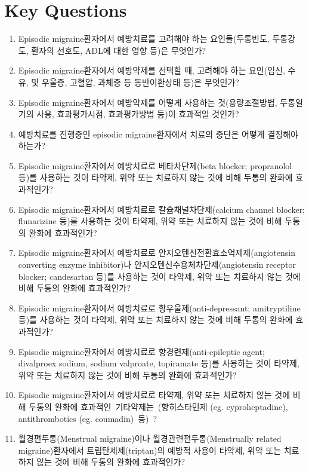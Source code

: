 \documentclass{paper}
\begin{document}
\section{Key Questions}
\begin{enumerate}
	\item Episodic migraine환자에서 예방치료를 고려해야 하는 요인들(두통빈도, 두통강도, 환자의 선호도, ADL에 대한 영향 등)은 무엇인가?
	\item Episodic migraine환자에서 예방약제를 선택할 때, 고려해야 하는 요인(임신, 수유, 및 우울증, 고혈압, 과체중 등 동반이환상태 등)은 무엇인가?
	\item Episodic migraine환자에서 예방약제를 어떻게 사용하는 것(용량조절방법, 두통일기의 사용, 효과평가시점, 효과평가방법 등)이 효과적일 것인가?
	\item 예방치료를 진행중인 episodic migraine환자에서 치료의 중단은 어떻게 결정해야 하는가?
	\item Episodic migraine환자에서 예방치료로 베타차단제(beta blocker; propranolol 등)를 사용하는 것이 타약제, 위약 또는 치료하지 않는 것에 비해 두통의 완화에 효과적인가?
	\item Episodic migraine환자에서 예방치료로 칼슘채널차단제(calcium channel blocker; flunarizine 등)를 사용하는 것이 타약제, 위약 또는 치료하지 않는 것에 비해 두통의 완화에 효과적인가?
	\item Episodic migraine환자에서 예방치료로 안지오텐신전환효소억제제(angiotensin converting enzyme inhibitor)나 안지오텐신수용체차단제(angiotensin receptor blocker; candesartan 등)를 사용하는 것이 타약제, 위약 또는 치료하지 않는 것에 비해 두통의 완화에 효과적인가?
	\item Episodic migraine환자에서 예방치료로 항우울제(anti-depressant; amitryptiline 등)를 사용하는 것이 타약제, 위약 또는 치료하지 않는 것에 비해 두통의 완화에 효과적인가?
	\item Episodic migraine환자에서 예방치료로 항경련제(anti-epileptic agent; divalproex sodium, sodium valproate, topiramate 등)를 사용하는 것이 타약제, 위약 또는 치료하지 않는 것에 비해 두통의 완화에 효과적인가?
	\item Episodic migraine환자에서 예방치료로 타약제, 위약 또는 치료하지 않는 것에 비해 두통의 완화에 효과적인 기타약제는 (항히스타민제 (eg. cyproheptadine), antithrombotics (eg. coumadin) 등) ?
	\item 월경편두통(Menstrual migraine)이나 월경관련편두통(Menstrually related migraine)환자에서 트립탄제제(triptan)의 예방적 사용이 타약제, 위약 또는 치료하지 않는 것에 비해 두통의 완화에 효과적인가?
\end{enumerate}

 
\end{document}

